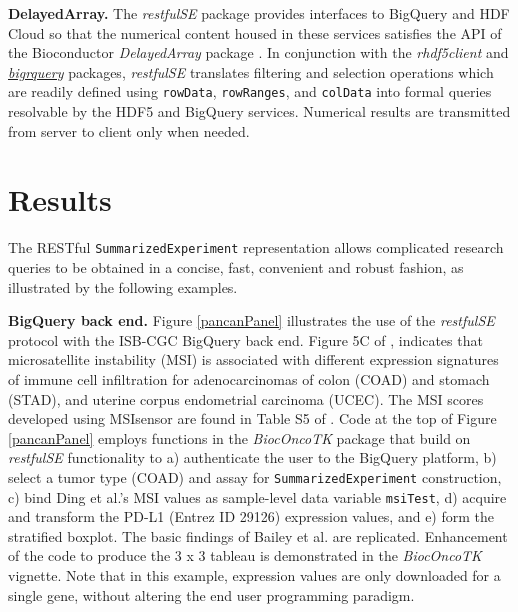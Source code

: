 \documentclass[applications]{gen-bioinformatics}
\newcommand{\Biocpackage}[1]{{\textit{#1}}}
\newcommand{\BiocpackageFirst}[1]{{\textit{#1}}}
\newcommand{\CRANpackageFirst}[1]{{\emph{\href{https://cran.r-project.org/web/packages/#1/index.html}{#1}}}}
\begin{document}
\noindent
\textbf{DelayedArray.}
The \Biocpackage{restfulSE} package provides interfaces to 
BigQuery and HDF Cloud so that 
the numerical content housed in these services
satisfies the API of the Bioconductor \BiocpackageFirst{DelayedArray} package \citep{Pages2018}.  
In conjunction with the \BiocpackageFirst{rhdf5client} \citep{rclient} and \CRANpackageFirst{bigrquery} \citep{bigr} packages,
\Biocpackage{restfulSE} translates filtering and selection operations
which are readily defined using \verb+rowData+, \verb+rowRanges+,
and \verb+colData+ into formal queries resolvable by the HDF5 and
BigQuery services.  Numerical results are transmitted from
server to client only when needed.

\section*{Results}

The RESTful \texttt{SummarizedExperiment} representation
allows complicated research queries to be obtained in a concise,
fast, convenient and robust fashion, as illustrated by
the following examples.

\textbf{BigQuery back end.} Figure \ref{pancanPanel} illustrates the 
use of the \Biocpackage{restfulSE} protocol
with the ISB-CGC BigQuery back end.  Figure 5C
of \citet{Bailey2018}, indicates that
microsatellite instability (MSI) is associated with
different expression signatures of immune cell infiltration
for adenocarcinomas of colon (COAD) and stomach (STAD), and
uterine corpus endometrial carcinoma (UCEC).  
The MSI scores developed using MSIsensor are found
in Table S5 of \cite{Ding2018}.
Code at the top of Figure \ref{pancanPanel} employs
functions in the \BiocpackageFirst{BiocOncoTK} \citep{bionc} package that build on
\Biocpackage{restfulSE} functionality to a) authenticate the
user to the BigQuery platform, b) select a tumor
type (COAD) and assay for \texttt{SummarizedExperiment}
construction, c) bind Ding et al.'s MSI values as
sample-level data variable \verb+msiTest+, d)
acquire and transform the PD-L1 
(Entrez ID 29126)
expression values, and e) form the stratified boxplot. 
The basic findings of Bailey et al. are replicated.
Enhancement of the code to produce the 3 x 3 tableau
is demonstrated in the \Biocpackage{BiocOncoTK} \citep{bionc} vignette.
Note that in this example, expression values are
only downloaded for a single gene, without altering
the end user programming paradigm.
\end{document}
